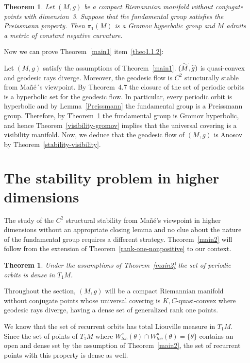 \documentclass[10pt]{amsart}
\newtheorem{theo}[cdrthm]{Theorem}
\theoremstyle{definition}
\let\oldtilde\tilde
\renewcommand*{\tilde}[1]{\mathchoice{\widetilde{#1}}{\widetilde{#1}}{\oldtilde{#1}}{\oldtilde{#1}}}
\begin{document}
\begin{theo}\label{Preissmann-3}
Let $(M,g)$ be a compact Riemannian manifold without conjugate points with dimension~3. Suppose that the fundamental group satisfies the Preissmann property. Then $\pi_{1}(M)$ is a Gromov hyperbolic group and $M$ admits a metric of constant negative curvature.
\end{theo}

Now we can prove Theorem~\ref{main1} item~\eqref{theo1.1.2}:

Let $(M,g)$ satisfy the assumptions of Theorem~\ref{main1}. $(\tilde{M}, \tilde{g})$ is quasi-convex and geodesic rays diverge. Moreover, the geodesic flow is $C^{2}$ structurally stable from Mañé´s viewpoint. By Theorem~4.7 the closure of the set of periodic orbits is a hyperbolic set for the geodesic flow. In particular, every periodic orbit is hyperbolic and by Lemma~\ref{Preissmann} the fundamental group is a Preissmann group. Therefore, by Theorem~\ref{Preissmann-3} the fundamental group is Gromov hyperbolic, and hence Theorem~\ref{visibility-gromov} implies that the universal covering is a visibility manifold. Now, we deduce that the geodesic flow of $(M,g)$ is Anosov by Theorem~\ref{stability-visibility}.

\section{The stability problem in higher dimensions}\label{SEChigher}

The study of the $C^{2}$ structural stability from Mañé's viewpoint in higher dimensions without an appropriate closing lemma and no clue about the nature of the fundamental group requires a different strategy. Theorem~\ref{main2} will follow from the extension of Theorem~\ref{rank-one-nonpositive} to our context.

\begin{theo}\label{density2}
Under the assumptions of Theorem~\ref{main2} the set of periodic orbits is dense in $T_{1}M$.
\end{theo}

Throughout the section, $(M,g)$ will be a compact Riemannian manifold without conjugate points whose universal covering is $K,C$-quasi-convex where geodesic rays diverge, having a dense set of generalized rank one points.

We know that the set of recurrent orbits has total Liouville measure in $T_{1}M$. Since the set of points of $T_{1}M$ where $W^{s}_{loc}(\theta) \cap W^{u}_{loc}(\theta) = \{ \theta\}$ contains an open and dense set by the assumption of Theorem~\ref{main2}, the set of recurrent points with this property is dense as well.
\end{document}
